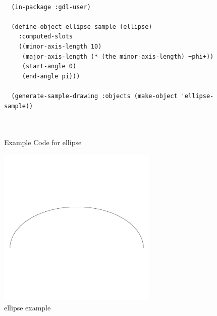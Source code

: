 \documentclass [11pt]{book}
\begin{document}
\begin{itemize}
\begin{description}
\end{description}




\begin{figure}
\begin{lrbox}{\boxedverb}
\begin{minipage}{\linewidth}
{\small

\begin{verbatim}
  
  (in-package :gdl-user)

  (define-object ellipse-sample (ellipse)
    :computed-slots
    ((minor-axis-length 10)
     (major-axis-length (* (the minor-axis-length) +phi+))
     (start-angle 0)
     (end-angle pi)))

  (generate-sample-drawing :objects (make-object 'ellipse-sample))
  
  
\end{verbatim}}
\end{minipage}
\end{lrbox}
\fbox{\usebox{\boxedverb}}

\caption{Example Code for ellipse}

\label{fig:example-code-ellipse}

\end{figure}

\begin{figure}
\begin{center}
\includegraphics[width=3in,height=3in]{../images/example-ellipse.pdf}
\end{center}

\caption{ellipse example}

\label{fig:ellipse}

\end{figure}






\end{itemize}
\end{document}
